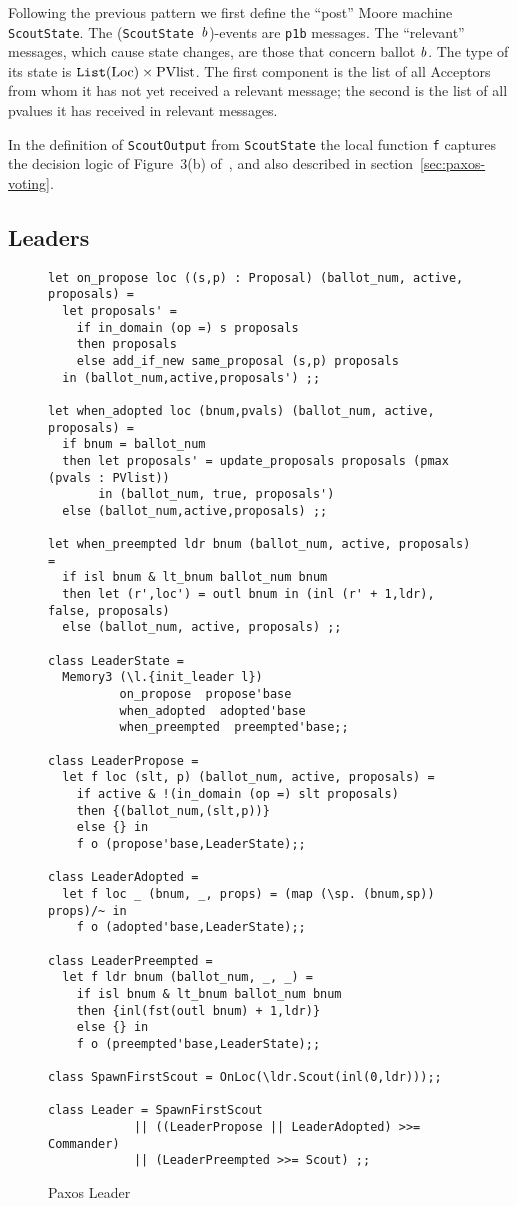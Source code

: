 \documentclass[final]{article}
\newcommand{\listinline}[1]{\text{\lstinline{#1}}}
\begin{document}
Following the previous pattern we first define the ``post'' Moore
machine \lstinline{ScoutState}.  The
(\lstinline{ScoutState}~$\mathit{b}$)-events are \lstinline{p1b}
messages.  The ``relevant'' messages, which cause state changes, are
those that concern ballot $\mathit{b}$.  The type of its state is
$\NUPRLprod{\NUPRLlist{\listinline{Loc}}}{\listinline{PVlist}}$.  The
first component is the list of all Acceptors from whom it has not yet
received a relevant message; the second is the list of all pvalues it
has received in relevant messages.

In the definition of \lstinline{ScoutOutput} from
\lstinline{ScoutState} the local function \lstinline{f} captures the
decision logic of Figure~3(b) of~\cite{VanRenesse:2011}, and also
described in section~\ref{sec:paxos-voting}.

\subsection{Leaders}

\begin{figure}%
  \begin{lstlisting}[basicstyle=\small]
let on_propose loc ((s,p) : Proposal) (ballot_num, active, proposals) =
  let proposals' =
    if in_domain (op =) s proposals
    then proposals
    else add_if_new same_proposal (s,p) proposals
  in (ballot_num,active,proposals') ;;

let when_adopted loc (bnum,pvals) (ballot_num, active, proposals) =
  if bnum = ballot_num
  then let proposals' = update_proposals proposals (pmax (pvals : PVlist))
       in (ballot_num, true, proposals')
  else (ballot_num,active,proposals) ;;

let when_preempted ldr bnum (ballot_num, active, proposals) =
  if isl bnum & lt_bnum ballot_num bnum
  then let (r',loc') = outl bnum in (inl (r' + 1,ldr), false, proposals)
  else (ballot_num, active, proposals) ;;

class LeaderState =
  Memory3 (\l.{init_leader l})
          on_propose  propose'base
          when_adopted  adopted'base
          when_preempted  preempted'base;;

class LeaderPropose =
  let f loc (slt, p) (ballot_num, active, proposals) =
    if active & !(in_domain (op =) slt proposals)
    then {(ballot_num,(slt,p))}
    else {} in
    f o (propose'base,LeaderState);;

class LeaderAdopted =
  let f loc _ (bnum, _, props) = (map (\sp. (bnum,sp)) props)/~ in
    f o (adopted'base,LeaderState);;

class LeaderPreempted =
  let f ldr bnum (ballot_num, _, _) =
    if isl bnum & lt_bnum ballot_num bnum
    then {inl(fst(outl bnum) + 1,ldr)}
    else {} in
    f o (preempted'base,LeaderState);;

class SpawnFirstScout = OnLoc(\ldr.Scout(inl(0,ldr)));;

class Leader = SpawnFirstScout
            || ((LeaderPropose || LeaderAdopted) >>= Commander)
            || (LeaderPreempted >>= Scout) ;;
  \end{lstlisting}
  \caption{Paxos Leader}
  \label{fig:Paxos-Leader}
\end{figure}
\end{document}
